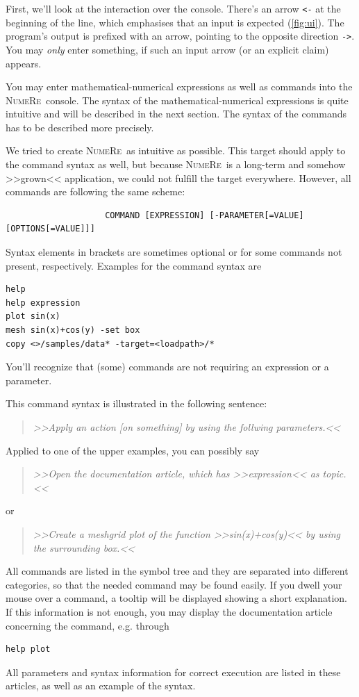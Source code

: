 \documentclass[DIV=14,headsepline,footsepline]{scrbook}
\newcommand{\NR}{\textsc{Nu\-me\-Re}}
\begin{document}
				First, we'll look at the interaction over the console. There's an arrow \lstinline+<-+ at the beginning of the line, which emphasises that an input is expected (\autoref{fig:ui}). The program's output is prefixed with an arrow, pointing to the opposite direction \lstinline+->+. You may \emph{only} enter something, if such an input arrow (or an explicit claim) appears.
				
				You may enter mathematical-numerical expressions as well as commands into the \NR\ console. The syntax of the mathematical-numerical expressions is quite intuitive and will be described in the next section. The syntax of the commands has to be described more precisely.
				
				We tried to create \NR\ as intuitive as possible. This target should apply to the command syntax as well, but because \NR\ is a long-term and somehow >>grown<< application, we could not fulfill the target everywhere. However, all commands are following the same scheme:
				\begin{verbatim}
					COMMAND [EXPRESSION] [-PARAMETER[=VALUE] [OPTIONS[=VALUE]]]
				\end{verbatim}
				Syntax elements in brackets are sometimes optional or for some commands not present, respectively. Examples for the command syntax are
				\begin{lstlisting}
help
help expression
plot sin(x)
mesh sin(x)+cos(y) -set box
copy <>/samples/data* -target=<loadpath>/*
				\end{lstlisting}
				You'll recognize that (some) commands are not requiring an expression or a parameter.
				
				This command syntax is illustrated in the following sentence:
				\begin{quotation}
					\noindent\emph{>>Apply an action [on something] by using the follwing parameters.<<}
				\end{quotation}
				Applied to one of the upper examples, you can possibly say
				\begin{quotation}
					\noindent\emph{>>Open the documentation article, which has >>expression<< as topic.<<}
				\end{quotation}
				or
				\begin{quotation}
					\noindent\emph{>>Create a meshgrid plot of the function >>sin(x)+cos(y)<< by using the surrounding box.<<}
				\end{quotation}
				
				All commands are listed in the symbol tree and they are separated into different categories, so that the needed command may be found easily. If you dwell your mouse over a command, a tooltip will be displayed showing a short explanation. If this information is not enough, you may display the documentation article concerning the command, e.g. through
				\begin{lstlisting}
help plot
				\end{lstlisting}
				All parameters and syntax information for correct execution are listed in these articles, as well as an example of the syntax.
				
\end{document}
